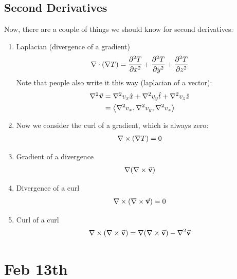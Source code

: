 \documentclass[10pt,oneside]{book}
\newcommand{\vv}{\vec{\mathbf{v}}}
\newcommand{\pvec}[1]{\left\langle#1\right\rangle}
\newcommand{\prtd}[2]{\frac{\partial^2#1}{\partial{#2}^2}}
\begin{document}
\subsection*{Second Derivatives}
Now, there are a couple of things we should know for second derivatives:
\begin{enumerate}
  \item Laplacian (divergence of a gradient)
  \begin{align*}
    \del\cdot(\del T)=\prtd{T}{x}+\prtd{T}y + \prtd{T}z
  \end{align*}
  Note that people also write it this way (laplacian of a vector):
  \begin{align*}
    \del^2\vv &= \del^2v_x\hat{x}+\del^2v_y \hat t + \del^2 v_z \hat z\\
    &=\pvec{\del^2 v_x, \del^2v_y, \del^2 v_z}
  \end{align*}
  \item Now we consider the curl of a gradient, which is always zero:
  \begin{align*}
    \nabla\times(\nabla T)=0
  \end{align*}
  \item Gradient of a divergence
  \begin{align*}
    \del(\del\times\vv)
  \end{align*}
  \item Divergence of a curl
  \begin{align*}
    \del\times(\del\times\vv)=0
  \end{align*}
  \item Curl of a curl
  \begin{align*}
    \del\times(\del\times\vv)=\del(\del\times\vv)-\del^2\vv
  \end{align*}
\end{enumerate}

\section*{Feb 13th}
\end{document}
